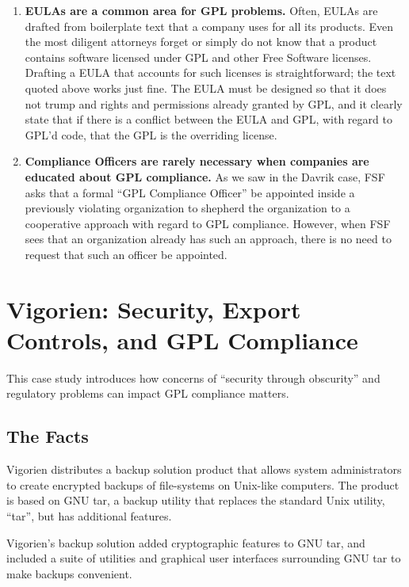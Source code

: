 \documentclass[12pt]{report}
\begin{document}
\begin{enumerate}
\item {\bf EULAs are a common area for GPL problems.}  Often, EULAs are
  drafted from boilerplate text that a company uses for all its products.
  Even the most diligent attorneys forget or simply do not know that a
  product contains software licensed under GPL and other Free Software
  licenses.  Drafting a EULA that accounts for such licenses is
  straightforward; the text quoted above works just fine.  The EULA must
  be designed so that it does not trump and rights and permissions already
  granted by GPL\@, and it clearly state that if there is a conflict
  between the EULA and GPL, with regard to GPL'd code, that the GPL is the
  overriding license.

\item {\bf Compliance Officers are rarely necessary when companies are
  educated about GPL compliance.}  As we saw in the Davrik case, FSF asks
  that a formal ``GPL Compliance Officer'' be appointed inside a
  previously violating organization to shepherd the organization to a
  cooperative approach with regard to GPL compliance.  However, when FSF
  sees that an organization already has such an approach, there is no
  need to request that such an officer be appointed.

\end{enumerate}


\chapter{Vigorien: Security, Export Controls, and GPL Compliance}

This case study introduces how concerns of ``security through obscurity''
and regulatory problems can impact GPL compliance matters.

\section{The Facts}

Vigorien distributes a backup solution product that allows system
administrators to create encrypted backups of file-systems on Unix-like
computers.  The product is based on GNU tar, a backup utility that
replaces the standard Unix utility, ``tar'', but has additional features.

Vigorien's backup solution added cryptographic features to GNU tar, and
included a suite of utilities and graphical user interfaces surrounding
GNU tar to make backups convenient.
\end{document}
